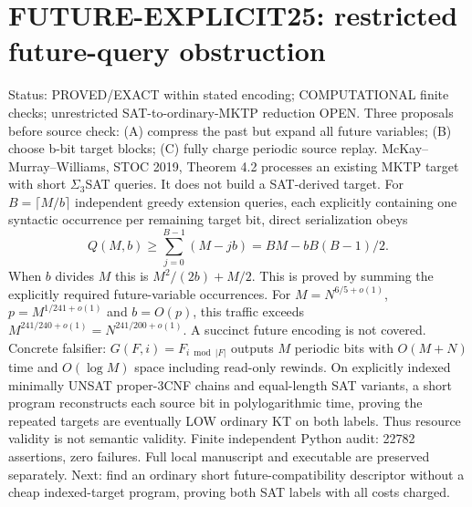 \documentclass{article}
\begin{document}
\section*{FUTURE-EXPLICIT25: restricted future-query obstruction}
Status: PROVED/EXACT within stated encoding; COMPUTATIONAL finite checks; unrestricted SAT-to-ordinary-MKTP reduction OPEN.
Three proposals before source check: (A) compress the past but expand all future variables; (B) choose b-bit target blocks; (C) fully charge periodic source replay.
McKay--Murray--Williams, STOC 2019, Theorem 4.2 processes an existing MKTP target with short $\Sigma_3$SAT queries. It does not build a SAT-derived target.
For $B=\lceil M/b\rceil$ independent greedy extension queries, each explicitly containing one syntactic occurrence per remaining target bit, direct serialization obeys
\[
Q(M,b)\ge \sum_{j=0}^{B-1}(M-jb)=BM-bB(B-1)/2.
\]
When $b$ divides $M$ this is $M^2/(2b)+M/2$. This is proved by summing the explicitly required future-variable occurrences. For $M=N^{6/5+o(1)}$, $p=M^{1/241+o(1)}$ and $b=O(p)$, this traffic exceeds $M^{241/240+o(1)}=N^{241/200+o(1)}$. A succinct future encoding is not covered.
Concrete falsifier: $G(F,i)=F_{i\bmod |F|}$ outputs $M$ periodic bits with $O(M+N)$ time and $O(\log M)$ space including read-only rewinds. On explicitly indexed minimally UNSAT proper-3CNF chains and equal-length SAT variants, a short program reconstructs each source bit in polylogarithmic time, proving the repeated targets are eventually LOW ordinary KT on both labels. Thus resource validity is not semantic validity.
Finite independent Python audit: 22782 assertions, zero failures. Full local manuscript and executable are preserved separately. Next: find an ordinary short future-compatibility descriptor without a cheap indexed-target program, proving both SAT labels with all costs charged.
\end{document}
